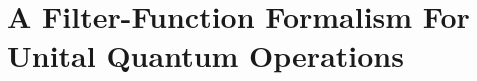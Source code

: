 \documentclass[
	a4paper, %
	fontsize=10pt, %
	twoside=false, %
	numbers=noenddot, %
	fontmethod=modern, %
	listing=minted
]{kaobook}
\begin{document}
\part{A Filter-Function Formalism For Unital Quantum Operations}
\label{part:ff}
\glsresetall








\appendix %

\label{part:appendix}
\glsresetall






\backmatter %



\printbibliography[
	heading=bibintoc,%
	title=Bibliography,
] %


\end{document}
